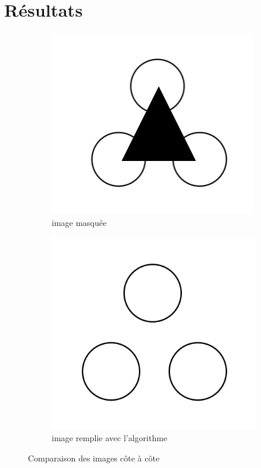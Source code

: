 \documentclass[10pt]{article}
\begin{document}
\section{Résultats}
\begin{figure}[h]
    \centering
    \begin{subfigure}{0.4\textwidth}
        \centering
        \includegraphics[width=\textwidth]{images/triangle.png}
        \caption{image masquée}
    \end{subfigure}
    \hfill
    \begin{subfigure}{0.4\textwidth}
        \centering
        \includegraphics[width=\textwidth]{images/triangle_inpaint.png}
        \caption{image remplie avec l'algorithme}
    \end{subfigure}
    \caption{Comparaison des images côte à côte}
\end{figure}
\end{document}
